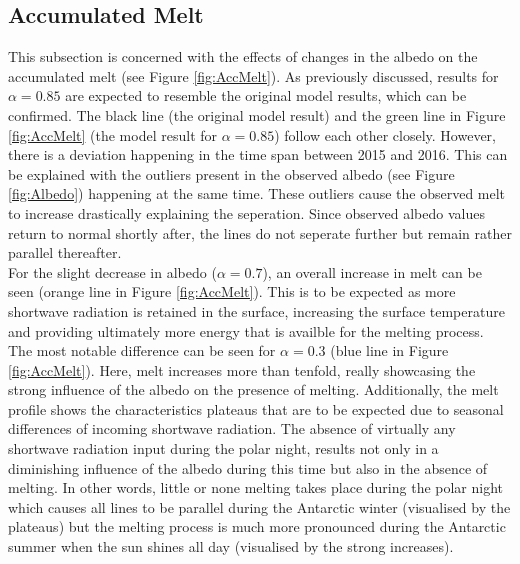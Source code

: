 \documentclass{article}
\begin{document}
\subsection*{Accumulated Melt}
This subsection is concerned with the effects of changes in the albedo on the accumulated melt (see Figure \ref{fig:AccMelt}).
As previously discussed, results for $\alpha = 0.85$ are expected to resemble the original model results, which can be confirmed.
The black line (the original model result) and the green line in Figure \ref{fig:AccMelt} (the model result for $\alpha = 0.85$) follow each other closely. 
However, there is a deviation happening in the time span between 2015 and 2016. 
This can be explained with the outliers present in the observed albedo (see Figure \ref{fig:Albedo}) happening at the same time. 
These outliers cause the observed melt to increase drastically explaining the seperation. 
Since observed albedo values return to normal shortly after, the lines do not seperate further but remain rather parallel thereafter. \\
For the slight decrease in albedo ($\alpha = 0.7$), an overall increase in melt can be seen (orange line in Figure \ref{fig:AccMelt}). 
This is to be expected as more shortwave radiation is retained in the surface, increasing the surface temperature and providing ultimately more energy that is availble for the melting process. \\ 
The most notable difference can be seen for $\alpha = 0.3$ (blue line in Figure \ref{fig:AccMelt}). 
Here, melt increases more than tenfold, really showcasing the strong influence of the albedo on the presence of melting. 
Additionally, the melt profile shows the characteristics plateaus that are to be expected due to seasonal differences of incoming shortwave radiation. 
The absence of virtually any shortwave radiation input during the polar night, results not only in a diminishing influence of the albedo during this time but also in the absence of melting. 
In other words, little or none melting takes place during the polar night which causes all lines to be parallel during the Antarctic winter (visualised by the plateaus) but the melting process is much more pronounced during the Antarctic summer when the sun shines all day (visualised by the strong increases).
\end{document}
